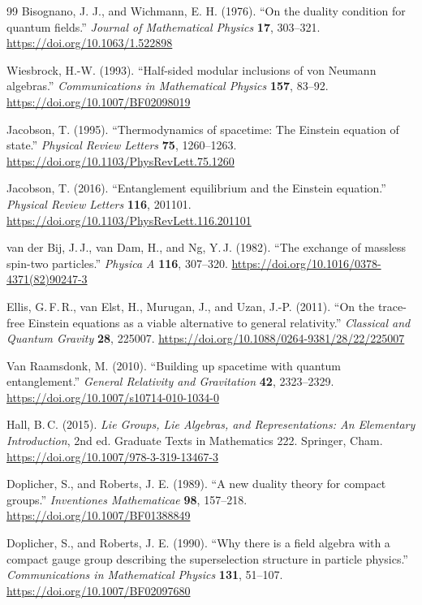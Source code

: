 \documentclass[11pt]{article}
\theoremstyle{definition}
\theoremstyle{remark}
\begin{document}
{\begin{thebibliography}{99}
Bisognano, J. J., and Wichmann, E. H. (1976). ``On the duality condition for
quantum fields.'' \emph{Journal of Mathematical Physics} \textbf{17},
303--321.
\url{https://doi.org/10.1063/1.522898}

Wiesbrock, H.-W. (1993). ``Half-sided modular inclusions of von Neumann
algebras.'' \emph{Communications in Mathematical Physics} \textbf{157},
83--92.
\url{https://doi.org/10.1007/BF02098019}

Jacobson, T. (1995). ``Thermodynamics of spacetime: The Einstein equation of
state.'' \emph{Physical Review Letters} \textbf{75}, 1260--1263.
\url{https://doi.org/10.1103/PhysRevLett.75.1260}

Jacobson, T. (2016). ``Entanglement equilibrium and the Einstein equation.''
\emph{Physical Review Letters} \textbf{116}, 201101.
\url{https://doi.org/10.1103/PhysRevLett.116.201101}

van der Bij, J.\,J., van Dam, H., and Ng, Y.\,J. (1982). ``The exchange
of massless spin-two particles.'' \emph{Physica A} \textbf{116},
307--320.
\url{https://doi.org/10.1016/0378-4371(82)90247-3}

Ellis, G.\,F.\,R., van Elst, H., Murugan, J., and Uzan, J.-P. (2011).
``On the trace-free Einstein equations as a viable alternative to general
relativity.'' \emph{Classical and Quantum Gravity} \textbf{28}, 225007.
\url{https://doi.org/10.1088/0264-9381/28/22/225007}

Van Raamsdonk, M. (2010). ``Building up spacetime with quantum entanglement.''
\emph{General Relativity and Gravitation} \textbf{42}, 2323--2329.
\url{https://doi.org/10.1007/s10714-010-1034-0}

Hall, B.\,C. (2015). \emph{Lie Groups, Lie Algebras, and Representations:
An Elementary Introduction}, 2nd ed. Graduate Texts in Mathematics 222.
Springer, Cham.
\url{https://doi.org/10.1007/978-3-319-13467-3}

Doplicher, S., and Roberts, J. E. (1989). ``A new duality theory for compact
groups.'' \emph{Inventiones Mathematicae} \textbf{98}, 157--218.
\url{https://doi.org/10.1007/BF01388849}

Doplicher, S., and Roberts, J. E. (1990). ``Why there is a field algebra with
a compact gauge group describing the superselection structure in particle
physics.'' \emph{Communications in Mathematical Physics} \textbf{131},
51--107.
\url{https://doi.org/10.1007/BF02097680}


\end{thebibliography}}
\end{document}
